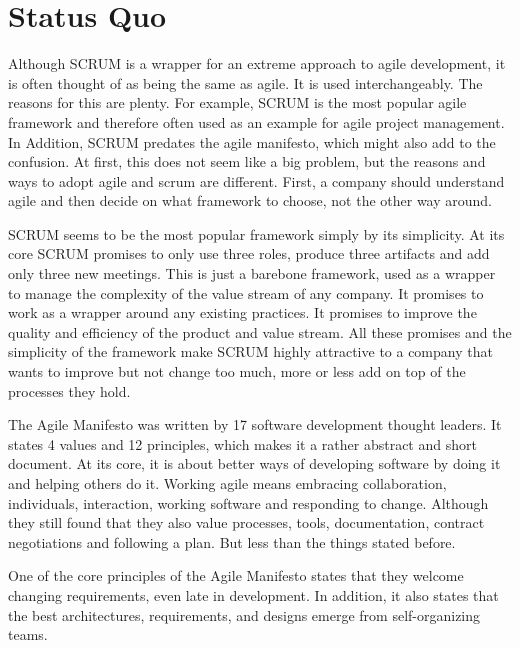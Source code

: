% 
\section*{Status Quo}

Although SCRUM is a wrapper for an extreme approach to agile development, it is often thought of as being the same as agile. It is used interchangeably. The reasons for this are plenty. For example, SCRUM is the most popular agile framework and therefore often used as an example for agile project management. In Addition, SCRUM predates the agile manifesto, which might also add to the confusion. At first, this does not seem like a big problem, but the reasons and ways to adopt agile and scrum are different. First, a company should understand agile and then decide on what framework to choose, not the other way around. 

SCRUM seems to be the most popular framework simply by its simplicity. At its core SCRUM promises to only use three roles, produce three artifacts and add only three new meetings. This is just a barebone framework, used as a wrapper to manage the complexity of the value stream of any company. It promises to work as a wrapper around any existing practices. It promises to improve the quality and efficiency of the product and value stream. All these promises and the simplicity of the framework make SCRUM highly attractive to a company that wants to improve but not change too much, more or less add on top of the processes they hold.

The Agile Manifesto was written by 17 software development thought leaders. It states 4 values and 12 principles, which makes it a rather abstract and short document. At its core, it is about better ways of developing software by doing it and helping others do it. Working agile means embracing collaboration, individuals, interaction, working software and responding to change. Although they still found that they also value processes, tools, documentation, contract negotiations and following a plan. But less than the things stated before.

One of the core principles of the Agile Manifesto states that they welcome changing requirements, even late in development. In addition, it also states that the best architectures, requirements, and designs emerge from self-organizing teams.

